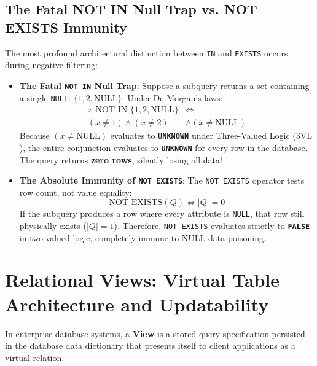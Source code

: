 \documentclass[10pt,twocolumn,letterpaper]{article}
\begin{document}
\subsection{The Fatal NOT IN Null Trap vs. NOT EXISTS Immunity}
The most profound architectural distinction between \texttt{IN} and \texttt{EXISTS} occurs during negative filtering:
\begin{itemize}
    \item \textbf{The Fatal \texttt{NOT IN} Null Trap}:
    Suppose a subquery returns a set containing a single \texttt{NULL}: $\{1, 2, \text{NULL}\}$. Under De Morgan's laws:
    \begin{equation}
    \begin{aligned}
    x \text{ NOT IN } \{1, 2, \text{NULL}\} &\iff \\
    (x \neq 1) \land (x \neq 2) &\land (x \neq \text{NULL})
    \end{aligned}
    \end{equation}
    Because $(x \neq \text{NULL})$ evaluates to \textbf{\texttt{UNKNOWN}} under Three-Valued Logic ($3\text{VL}$), the entire conjunction evaluates to \textbf{\texttt{UNKNOWN}} for every row in the database. The query returns \textbf{zero rows}, silently losing all data!
    \item \textbf{The Absolute Immunity of \texttt{NOT EXISTS}}:
    The \texttt{NOT EXISTS} operator tests row count, not value equality:
    \begin{equation}
    \text{NOT EXISTS}(Q) \iff |Q| = 0
    \end{equation}
    If the subquery produces a row where every attribute is \texttt{NULL}, that row still physically exists ($|Q| = 1$). Therefore, \texttt{NOT EXISTS} evaluates strictly to \textbf{\texttt{FALSE}} in two-valued logic, completely immune to NULL data poisoning.
\end{itemize}

\section{Relational Views: Virtual Table Architecture and Updatability}
\label{sec:views}

In enterprise database systems, a \textbf{View} is a stored query specification persisted in the database data dictionary that presents itself to client applications as a virtual relation.
\end{document}
